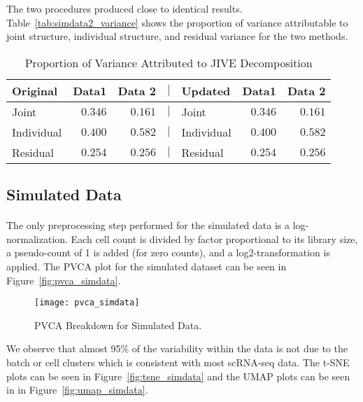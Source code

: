 \documentclass[
12pt, %
letterpaper, %
oneside, %
headinclude,footinclude, %
BCOR5mm, %
]{scrartcl}
\begin{document}
The two procedures produced close to identical results. Table~\vref{tab:simdata2_variance} shows the proportion of variance attributable to joint structure, individual structure, and residual variance for the two methods.

\begin{table}[ht]
    \caption{Proportion of Variance Attributed to JIVE Decomposition}
    \centering
    \begin{tabular}{lrrclrr}
        \toprule
        Original   & Data1 & Data 2    & $\mid$ & Updated    & Data1 & Data 2 \\
        \midrule
        Joint      & $0.346$ & $0.161$ & $\mid$ & Joint      & $0.346$ & $0.161$ \\
        Individual & $0.400$ & $0.582$ & $\mid$ & Individual & $0.400$ & $0.582$ \\
        Residual   & $0.254$ & $0.256$ & $\mid$ & Residual   & $0.254$ & $0.256$ \\
        \bottomrule
        \end{tabular}
    \label{tab:simdata2_variance}
\end{table}


\subsection{Simulated Data}

\paragraph*{}
The only preprocessing step performed for the simulated data is a log-normalization. Each cell count is divided by factor proportional to its library size, a pseudo-count of 1 is added (for zero counts), and a log2-transformation is applied. The PVCA plot for the simulated dataset can be seen in Figure~\vref{fig:pvca_simdata}.

\begin{figure}[H]
    \centering 
    \texttt{[image: pvca\_simdata]} 
    \caption[PVCA Breakdown for Simulated Data]{PVCA Breakdown for Simulated Data.}
    \label{fig:pvca_simdata} 
\end{figure}

We observe that almost 95\% of the variability within the data is not due to the batch or cell clusters which is consistent with most scRNA-seq data. The t-SNE plots can be seen in Figure~\vref{fig:tsne_simdata} and the UMAP plots can be seen in in Figure~\vref{fig:umap_simdata}.
\end{document}
